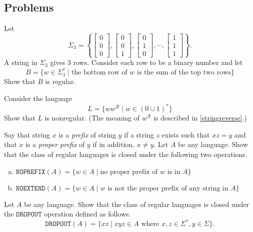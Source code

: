 \subsection*{Problems}

\begin{exercise}
Let
$$\Sigma_3=\left\{\begin{bmatrix}0\\0\\0\end{bmatrix}, \begin{bmatrix}0\\0\\1\end{bmatrix}, \begin{bmatrix}0\\1\\0\end{bmatrix},\cdots,\begin{bmatrix}1\\1\\1\end{bmatrix}\right\}.$$
A string in $\Sigma_3$ gives $3$ rows. Consider each row to be a binary number and let
$$B=\{w\in\Sigma_3^*\mid \text{the bottom row of $w$ is the sum of the top two rows}\}$$
Show that $B$ is regular.
\end{exercise}

\begin{exercise}
\label{LwwR}
Consider the language
$$L=\{ww^\mathcal{R}\mid w\in (0\cup 1)^*\}$$
Show that $L$ is nonregular. (The meaning of $w^\mathcal{R}$ is described in \ref{stringreverse}.)
\end{exercise}

\begin{exercise}
Say that string $x$ is a \textit{prefix} of string $y$ if a string $z$ exists such that $xz=y$ and that $x$ is a \textit{proper prefix} of $y$ if in addition, $x\neq y$. Let $A$ be any language. Show that the class of regular languages is closed under the following two operations.
\begin{enumerate}[(a)]
	\item $\texttt{NOPREFIX}(A)=\{w\in A\mid \text{no proper prefix of $w$ is in $A$}\}$
	\item $\texttt{NOEXTEND}(A)=\{w\in A\mid w\text{ is not the proper prefix of any string in $A$}\}$
\end{enumerate}
\end{exercise}

\begin{exercise}
Let $A$ be any language. Show that the class of regular languages is closed under the $\texttt{DROPOUT}$ operation defined as follows.
$$\texttt{DROPOUT}(A)=\{xz\mid xyz\in A\text{ where }x,z\in\Sigma^*,y\in\Sigma\}.$$
\end{exercise}

